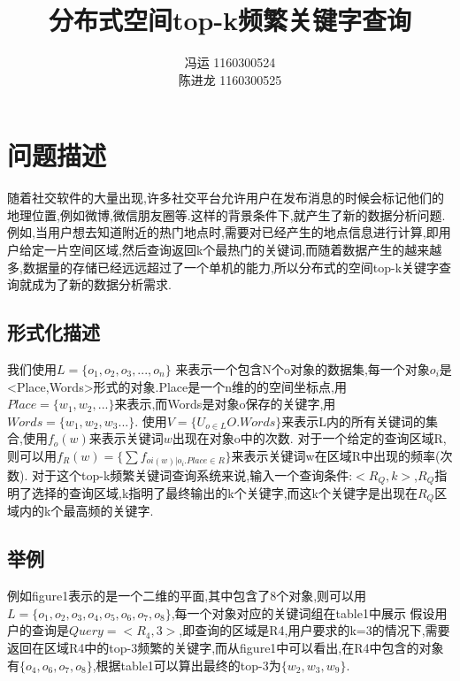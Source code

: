 \documentclass{elegantpaper}
\title{分布式空间top-k频繁关键字查询}
\author{
    冯运 1160300524 %
    \\[0.5ex] %
    陈进龙 1160300525 %
}
\begin{document}
\maketitle

\begin{abstract}
\end{abstract}

\section{问题描述}

随着社交软件的大量出现,许多社交平台允许用户在发布消息的时候会标记他们的地理位置,例如微博,微信朋友圈等.这样的背景条件下,就产生了新的数据分析问题.例如,当用户想去知道附近的热门地点时,需要对已经产生的地点信息进行计算,即用户给定一片空间区域,然后查询返回k个最热门的关键词,而随着数据产生的越来越多,数据量的存储已经远远超过了一个单机的能力,所以分布式的空间top-k关键字查询就成为了新的数据分析需求.

\subsection{形式化描述}
我们使用$L=\{o_1,o_2,o_3,...,o_n\} $ 来表示一个包含N个o对象的数据集,每一个对象$o_i$是<Place,Words>形式的对象.Place是一个n维的的空间坐标点,用$Place=\{w_1,w_2,...\}$来表示,而Words是对象o保存的关键字,用$Words=\{w_1,w_2,w_3... \}$.\newline
使用$V=\{U_{o\in L}O.Words\}$来表示L内的所有关键词的集合,使用$f_o(w)$来表示关键词$w$出现在对象o中的次数.\newline
对于一个给定的查询区域R,则可以用$f_R(w)=\{\sum{f_{oi(w)|o_i.Place\in R}} \}$来表示关键词w在区域R中出现的频率(次数).\newline
对于这个top-k频繁关键词查询系统来说,输入一个查询条件:$<R_Q,k>$,$R_Q$指明了选择的查询区域,k指明了最终输出的k个关键字,而这k个关键字是出现在$R_Q$区域内的k个最高频的关键字.\newline

\subsection{举例}

例如figure1表示的是一个二维的平面,其中包含了8个对象,则可以用$L=\{o_1,o_2,o_3,o_4,o_5,o_6,o_7,o_8\}$,每一个对象对应的关键词组在table1中展示
假设用户的查询是$Query=<R_4,3>$,即查询的区域是R4,用户要求的k=3的情况下,需要返回在区域R4中的top-3频繁的关键字,而从figure1中可以看出,在R4中包含的对象有$\{o_4,o_6,o_7,o_8\}$,根据table1可以算出最终的top-3为$\{w_2,w_3,w_9\}$.
\end{document}
